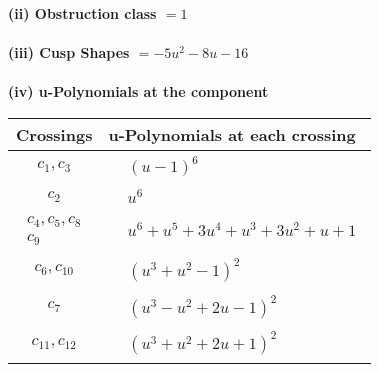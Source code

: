\documentclass[1p]{elsarticle_modified}
\theoremstyle{definition}
\begin{document}
\flushleft \textbf{(ii) Obstruction class $= 1$}\\~\\
\flushleft \textbf{(iii) Cusp Shapes $= -5 u^2-8 u-16$}\\~\\
\newpage\renewcommand{\arraystretch}{1}
\flushleft \textbf{(iv) u-Polynomials at the component}\newline \\
\begin{tabular}{m{50pt}|m{274pt}}
Crossings & \hspace{64pt}u-Polynomials at each crossing \\
\hline $$\begin{aligned}c_{1},c_{3}\end{aligned}$$&$\begin{aligned}
&(u-1)^6
\end{aligned}$\\
\hline $$\begin{aligned}c_{2}\end{aligned}$$&$\begin{aligned}
&u^6
\end{aligned}$\\
\hline $$\begin{aligned}c_{4},c_{5},c_{8}\\c_{9}\end{aligned}$$&$\begin{aligned}
&u^6+u^5+3 u^4+u^3+3 u^2+u+1
\end{aligned}$\\
\hline $$\begin{aligned}c_{6},c_{10}\end{aligned}$$&$\begin{aligned}
&(u^3+u^2-1)^2
\end{aligned}$\\
\hline $$\begin{aligned}c_{7}\end{aligned}$$&$\begin{aligned}
&(u^3- u^2+2 u-1)^2
\end{aligned}$\\
\hline $$\begin{aligned}c_{11},c_{12}\end{aligned}$$&$\begin{aligned}
&(u^3+u^2+2 u+1)^2
\end{aligned}$\\
\hline
\end{tabular}\\~\\
\end{document}
